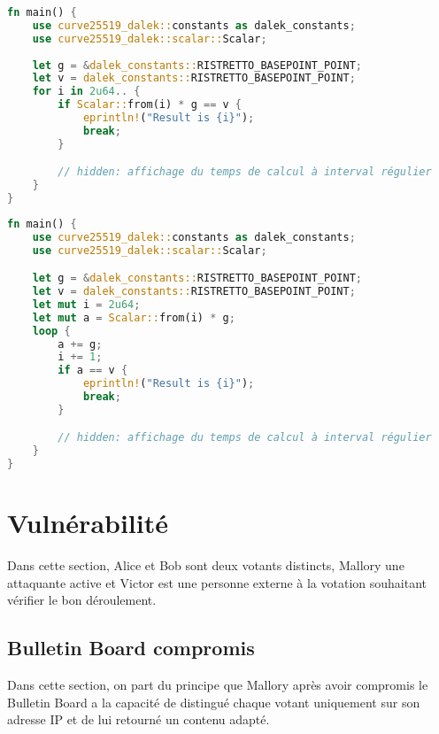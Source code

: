 \documentclass[../report]{subfiles}
\begin{document}

\begin{lstlisting}[language=Rust,caption={Vitesse de calcul résultat final (très naif)},style=numbers,label={lst:perf:resultat-1}]
fn main() {
    use curve25519_dalek::constants as dalek_constants;
    use curve25519_dalek::scalar::Scalar;
        
    let g = &dalek_constants::RISTRETTO_BASEPOINT_POINT;
    let v = dalek_constants::RISTRETTO_BASEPOINT_POINT;
    for i in 2u64.. {
        if Scalar::from(i) * g == v {
            eprintln!("Result is {i}");
            break;
        }

        // hidden: affichage du temps de calcul à interval régulier
    }
}
\end{lstlisting}%
\begin{lstlisting}[language=Rust,caption={Vitesse de calcul résultat final (un peu moins naif)},style=numbers,label={lst:perf:resultat-2}]
fn main() {
    use curve25519_dalek::constants as dalek_constants;
    use curve25519_dalek::scalar::Scalar;

    let g = &dalek_constants::RISTRETTO_BASEPOINT_POINT;
    let v = dalek_constants::RISTRETTO_BASEPOINT_POINT;
    let mut i = 2u64;
    let mut a = Scalar::from(i) * g;
    loop {
        a += g;
        i += 1;
        if a == v {
            eprintln!("Result is {i}");
            break;
        }

        // hidden: affichage du temps de calcul à interval régulier
    }
}
\end{lstlisting}%

\chapter{Vulnérabilité}

Dans cette section, Alice et Bob sont deux votants distincts, Mallory une attaquante active et Victor est une personne externe à la votation 
souhaitant vérifier le bon déroulement.

\section{Bulletin Board compromis}

Dans cette section, on part du principe que Mallory après avoir compromis le Bulletin Board a la capacité
de distingué chaque votant uniquement sur son adresse IP et de lui retourné un contenu adapté.
\end{document}
